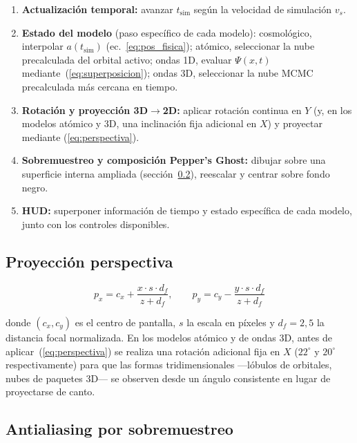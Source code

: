 \documentclass[12pt, a4paper]{article}
\begin{document}
\begin{enumerate}
  \item \textbf{Actualización temporal:} avanzar $t_{\text{sim}}$
        según la velocidad de simulación $v_s$.
  \item \textbf{Estado del modelo} (paso específico de cada modelo):
        cosmológico, interpolar $a(t_{\text{sim}})$
        (ec.~\ref{eq:pos_fisica}); atómico, seleccionar la nube
        precalculada del orbital activo; ondas 1D, evaluar
        $\Psi(x,t)$ mediante~(\ref{eq:superposicion}); ondas 3D,
        seleccionar la nube MCMC precalculada más cercana en tiempo.
  \item \textbf{Rotación y proyección 3D$\to$2D:} aplicar rotación
        continua en $Y$ (y, en los modelos atómico y 3D, una
        inclinación fija adicional en $X$) y proyectar mediante
        (\ref{eq:perspectiva}).
  \item \textbf{Sobremuestreo y composición Pepper's Ghost:} dibujar
        sobre una superficie interna ampliada
        (sección~\ref{sec:antialiasing}), reescalar y centrar sobre
        fondo negro.
  \item \textbf{HUD:} superponer información de tiempo y estado
        específica de cada modelo, junto con los controles
        disponibles.
\end{enumerate}

\subsection{Proyección perspectiva}

\begin{equation}
  p_x = c_x + \frac{x \cdot s \cdot d_f}{z + d_f}, \qquad
  p_y = c_y - \frac{y \cdot s \cdot d_f}{z + d_f}
  \label{eq:perspectiva}
\end{equation}

donde $(c_x, c_y)$ es el centro de pantalla, $s$ la escala en píxeles
y $d_f=2{,}5$ la distancia focal normalizada. En los modelos atómico y
de ondas 3D, antes de aplicar~(\ref{eq:perspectiva}) se realiza una
rotación adicional fija en $X$ ($22^\circ$ y $20^\circ$
respectivamente) para que las formas tridimensionales —lóbulos de
orbitales, nubes de paquetes 3D— se observen desde un ángulo
consistente en lugar de proyectarse de canto.

\subsection{Antialiasing por sobremuestreo}
\label{sec:antialiasing}
\end{document}
